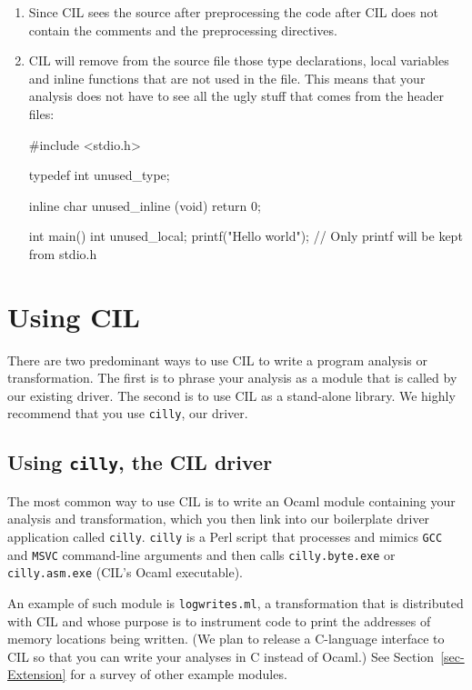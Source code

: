 \documentclass{article}
\def\secref#1{Section~\ref{sec-#1}}
\def\t#1{{\tt #1}}
\begin{document}
\begin{enumerate}
\item Since CIL sees the source after preprocessing the code after CIL does
not contain the comments and the preprocessing directives.

\item CIL will remove from the source file those type declarations, local
variables and inline functions that are not used in the file. This means that
your analysis does not have to see all the ugly stuff that comes from the
header files: 
\begin{cilcode}[global]
#include <stdio.h>

typedef int unused_type;

inline char unused_inline (void) { return 0; }

int main() {
  int unused_local;
  printf("Hello world\n"); // Only printf will be kept from stdio.h     
}
\end{cilcode}

\end{enumerate}

\section{Using CIL}\label{sec-cil}

There are two predominant ways to use CIL to write a program analysis or
transformation. The first is to phrase your analysis as a module that is
called by our existing driver. The second is to use CIL as a stand-alone
library. We highly recommend that you use \t{cilly}, our driver. 

\subsection{Using \t{cilly}, the CIL driver}

The most common way to use CIL is to write an Ocaml module containing your
analysis and transformation, which you then link into our boilerplate
driver application called \t{cilly}. \t{cilly} is a Perl script that
processes and mimics \t{GCC} and \t{MSVC} command-line arguments and then
calls \t{cilly.byte.exe} or \t{cilly.asm.exe} (CIL's Ocaml executable). 

An example of such module is \t{logwrites.ml}, a transformation that is
distributed with CIL and whose purpose is to instrument code to print the
addresses of memory locations being written. (We plan to release a
C-language interface to CIL so that you can write your analyses in C
instead of Ocaml.) See \secref{Extension} for a survey of other example
modules. 
\end{document}
